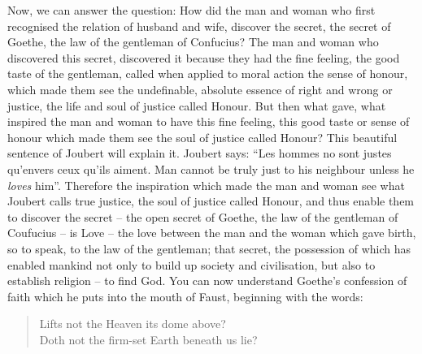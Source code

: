 Now, we can answer the question: How did the man and woman who first recognised the relation of husband and wife, discover the secret, the secret of Goethe, the law of the gentleman of Confucius?
The man and woman who discovered this secret, discovered it because they had the fine feeling, the good taste of the gentleman, called when applied to moral action the sense of honour, which made them see the undefinable, absolute essence of right and wrong or justice, the life and soul of justice called Honour.
But then what gave, what inspired the man and woman to have this fine feeling, this good taste or sense of honour which made them see the soul of justice called Honour?
This beautiful sentence of Joubert will explain it.
Joubert says: ``Les hommes no sont justes qu'envers ceux qu'ils aiment.
Man cannot be truly just to his neighbour unless he \emph{loves} him''.
Therefore the inspiration which made the man and woman see what Joubert calls true justice, the soul of justice called Honour,
and thus enable them to discover the secret -- the open secret of Goethe, the law of the gentleman of Coufucius  -- is Love -- the love between the man and the woman which gave birth, so to speak, to the law of the gentleman;
that secret, the possession of which has enabled mankind not only to build up society and civilisation, but also to establish religion -- to find God.
You can now understand Goethe's confession of faith which he puts into the mouth of Faust, beginning with the words:
\begin{quote}
Lifts not the Heaven its dome above? \\
Doth not the firm-set Earth beneath us lie?
\end{quote}

